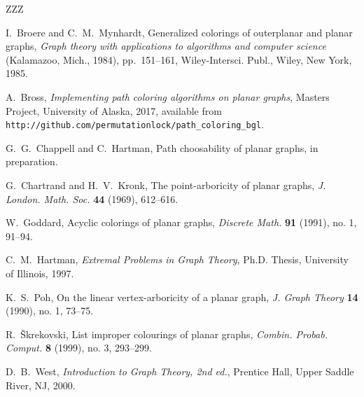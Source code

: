 \documentclass[12pt,letterpaper]{article}
\theoremstyle{plain}
\theoremstyle{definition}
\theoremstyle{break}
\begin{document}
ZZZ


\begin{thebibliography}{99}

I.~Broere and C.~M.~Mynhardt,
Generalized colorings of outerplanar and planar graphs,
\textit{Graph theory with applications to algorithms and computer science}
 (Kalamazoo, Mich., 1984),
pp.~151--161,
Wiley-Intersci. Publ., Wiley, New York, 1985.

A.~Bross,
\textit{Implementing path coloring algorithms on planar graphs},
Masters Project,
University of Alaska,
2017,
available from\hfil\break
\texttt{http://github.com/permutationlock/path\_coloring\_bgl}.

G.~G.~Chappell and C.~Hartman,
Path choosability of planar graphs,
in preparation.

G.~Chartrand and H.~V.~Kronk,
The point-arboricity of planar graphs,
\textit{J. London. Math. Soc.}
\textbf{44} (1969),
612--616.

W.~Goddard,
Acyclic colorings of planar graphs,
\textit{Discrete Math.}
\textbf{91} (1991), no. 1,
91--94.

C.~M.~Hartman,
\textit{Extremal Problems in Graph Theory},
Ph.D. Thesis,
University of Illinois,
1997.

K.~S.~Poh,
On the linear vertex-arboricity of a planar graph,
\textit{J. Graph Theory}
\textbf{14} (1990), no. 1,
73--75.

R.~\v{S}krekovski,
List improper colourings of planar graphs,
\textit{Combin. Probab. Comput.}
\textbf{8} (1999), no. 3,
293--299.

D.~B.~West,
\textit{Introduction to Graph Theory, 2nd ed.},
Prentice Hall,
Upper Saddle River, NJ,
2000.

\end{thebibliography}
\end{document}
